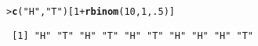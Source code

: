\documentclass{article}\usepackage[]{graphicx}\usepackage[]{color}
\makeatletter
\newcommand{\hlnum}[1]{\textcolor[rgb]{0.686,0.059,0.569}{#1}}%
\newcommand{\hlstr}[1]{\textcolor[rgb]{0.192,0.494,0.8}{#1}}%
\newcommand{\hlopt}[1]{\textcolor[rgb]{0,0,0}{#1}}%
\newcommand{\hlstd}[1]{\textcolor[rgb]{0.345,0.345,0.345}{#1}}%
\newcommand{\hlkwd}[1]{\textcolor[rgb]{0.737,0.353,0.396}{\textbf{#1}}}%
\newenvironment{kframe}{%
 \def\at@end@of@kframe{}%
 \ifinner\ifhmode%
  \def\at@end@of@kframe{\end{minipage}}%
  \begin{minipage}{\columnwidth}%
 \fi\fi%
 \def\FrameCommand##1{\hskip\@totalleftmargin \hskip-\fboxsep
 \colorbox{shadecolor}{##1}\hskip-\fboxsep
     \hskip-\linewidth \hskip-\@totalleftmargin \hskip\columnwidth}%
 \MakeFramed {\advance\hsize-\width
   \@totalleftmargin\z@ \linewidth\hsize
   \@setminipage}}%
 {\par\unskip\endMakeFramed%
 \at@end@of@kframe}
\newenvironment{knitrout}{}{} %
\makeatother
\begin{document}
\begin{knitrout}
\color{fgcolor}\begin{kframe}
\begin{alltt}
\hlstd{> }\hlkwd{c}\hlstd{(}\hlstr{"H"}\hlstd{,} \hlstr{"T"}\hlstd{)[}\hlnum{1} \hlopt{+} \hlkwd{rbinom}\hlstd{(}\hlnum{10}\hlstd{,} \hlnum{1}\hlstd{,} \hlnum{.5}\hlstd{)]}
\end{alltt}
\begin{verbatim}
 [1] "H" "T" "H" "T" "H" "T" "H" "H" "H" "T"
\end{verbatim}
\end{kframe}
\end{knitrout}

 
\end{document}
